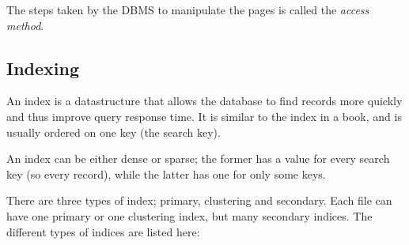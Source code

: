 The steps taken by the DBMS to manipulate the pages is called the \textit{access
method}.

\subsection{Indexing}

An index is a datastructure that allows the database to find records more
quickly and thus improve query response time. It is similar to the index in a
book, and is usually ordered on one key (the search key).

An index can be either dense or sparse; the former has a value for every search
key (so every record), while the latter has one for only some keys.

There are three types of index; primary, clustering and secondary. Each file can
have one primary or one clustering index, but many secondary indices. The
different types of indices are listed here:

